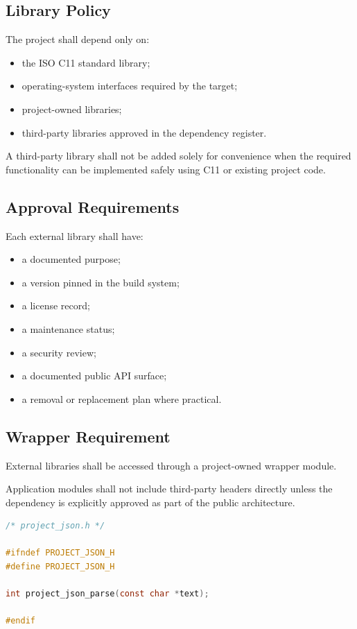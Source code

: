 \subsection{Library Policy}

The project shall depend only on:

\begin{itemize}
	\item the ISO C11 standard library;
	\item operating-system interfaces required by the target;
	\item project-owned libraries;
	\item third-party libraries approved in the dependency register.
\end{itemize}

A third-party library shall not be added solely for convenience when the required functionality can be implemented safely using C11 or existing project code.

\subsection{Approval Requirements}

Each external library shall have:

\begin{itemize}
	\item a documented purpose;
	\item a version pinned in the build system;
	\item a license record;
	\item a maintenance status;
	\item a security review;
	\item a documented public API surface;
	\item a removal or replacement plan where practical.
\end{itemize}

\subsection{Wrapper Requirement}

External libraries shall be accessed through a project-owned wrapper module.

Application modules shall not include third-party headers directly unless the dependency is explicitly approved as part of the public architecture.

\begin{lstlisting}[language=C]
/* project_json.h */

#ifndef PROJECT_JSON_H
#define PROJECT_JSON_H

int project_json_parse(const char *text);

#endif
\end{lstlisting}
